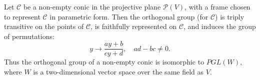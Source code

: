 Let $\mathcal{C}$ be a non-empty conic in the projective plane $\mathcal{P}(V)$, with a frame chosen to represent $\mathcal{C}$ in parametric form. Then the orthogonal group (for $\mathcal{C}$) is triply transitive on the points of $\mathcal{C}$, is faithfully represented on $\mathcal{C}$, and induces the group of permutations:
$$y \to \frac{ay + b}{cy + d}, \quad ad - bc \neq 0.$$
Thus the orthogonal group of a non-empty conic is isomorphic to $PGL(W)$, where $W$ is a two-dimensional vector space over the same field as $V$.
